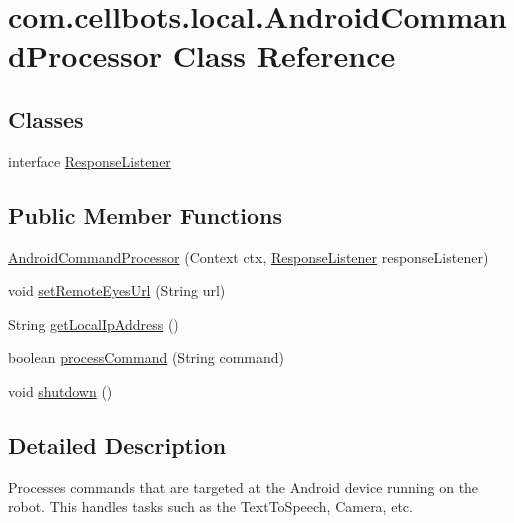 \hypertarget{classcom_1_1cellbots_1_1local_1_1_android_command_processor}{\section{com.\-cellbots.\-local.\-Android\-Command\-Processor Class Reference}
\label{classcom_1_1cellbots_1_1local_1_1_android_command_processor}
}
\subsection*{Classes}
\begin{DoxyCompactItemize}
\item 
interface \hyperlink{interfacecom_1_1cellbots_1_1local_1_1_android_command_processor_1_1_response_listener}{Response\-Listener}
\end{DoxyCompactItemize}
\subsection*{Public Member Functions}
\begin{DoxyCompactItemize}
\item 
\hyperlink{classcom_1_1cellbots_1_1local_1_1_android_command_processor_ab2df475fa470586c7d730f25bfcd7624}{Android\-Command\-Processor} (Context ctx, \hyperlink{interfacecom_1_1cellbots_1_1local_1_1_android_command_processor_1_1_response_listener}{Response\-Listener} response\-Listener)
\item 
void \hyperlink{classcom_1_1cellbots_1_1local_1_1_android_command_processor_a0034b743b0240baf966e1607418b4027}{set\-Remote\-Eyes\-Url} (String url)
\item 
String \hyperlink{classcom_1_1cellbots_1_1local_1_1_android_command_processor_abe3c29910872de55f5c20f787e69a754}{get\-Local\-Ip\-Address} ()
\item 
boolean \hyperlink{classcom_1_1cellbots_1_1local_1_1_android_command_processor_a2a57f5fa4001b0e61d2ff9c964c70b7e}{process\-Command} (String command)
\item 
void \hyperlink{classcom_1_1cellbots_1_1local_1_1_android_command_processor_aee7f1971d62a494b97e9b27c6baafe71}{shutdown} ()
\end{DoxyCompactItemize}


\subsection{Detailed Description}
Processes commands that are targeted at the Android device running on the robot. This handles tasks such as the Text\-To\-Speech, Camera, etc.

